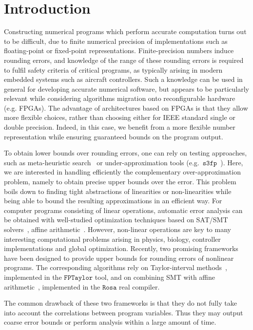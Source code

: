 \documentclass[preprint]{sigplanconf}
\newcommand{\sthreefp}{\mathtt{s3fp}}
\newcommand{\rosa}{\mathtt{Rosa}}
\newcommand{\fptaylor}{\mathtt{FPTaylor}}
\theoremstyle{plain}
\begin{document}
\section{Introduction} %
\label{sec:intro}
%
Constructing numerical programs which perform accurate computation turns out to be difficult, due to finite numerical precision of implementations such as floating-point or fixed-point representations. Finite-precision numbers induce rounding errors,  and knowledge of the range of these rounding errors is required to fulfil safety criteria of critical programs, as typically arising in modern embedded systems such as aircraft controllers. Such a knowledge can be used in general for developing accurate numerical software, but appears to be particularly relevant while considering algorithms migration onto reconfigurable hardware (e.g. FPGAs). The advantage of architectures based on FPGAs is that they allow more flexible choices, rather than choosing either for IEEE standard single or double precision. Indeed, in this case, we benefit from a more flexible number representation while ensuring guaranteed bounds on the program output. 

To obtain lower bounds over rounding errors, one can rely on testing approaches, such as meta-heuristic search~\cite{Borges12Test} or under-approximation tools (e.g.~$\sthreefp$~\cite{Chiang14s3fp}). Here, we are interested in handling efficiently the complementary over-approximation problem, namely to obtain precise upper bounds over the error. This problem boils down to finding tight abstractions of linearities or non-linearities while being able to bound the resulting approximations in an efficient way.  
%
For computer programs consisting of linear operations, automatic error analysis can be obtained with well-studied optimization techniques based on SAT/SMT solvers~\cite{hgbk2012fmcad}, affine arithmetic~\cite{fluctuat}. However, non-linear operations are key to many interesting computational problems arising in physics, biology, controller implementations and global optimization. 
Recently, two promising frameworks have been designed to provide upper bounds for rounding errors of nonlinear programs. The corresponding algorithms rely on Taylor-interval methods~\cite{fptaylor15}, implemented in the $\fptaylor$ tool, and on combining SMT with affine arithmetic~\cite{Darulova14Popl}, implemented in the $\rosa$ real compiler.

The common drawback of these two frameworks is that they do not fully take into account the correlations between program variables. Thus they may output coarse error bounds or perform analysis within a large amount of time.  
\end{document}
